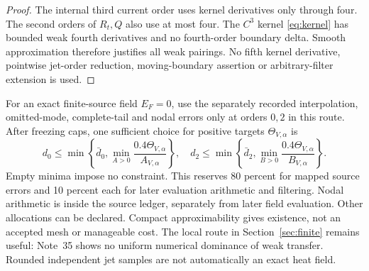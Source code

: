 \begin{proof}
The internal third current order uses kernel derivatives only through
four. The second orders of $R_t,Q$ also use at most four. The $C^3$
kernel \eqref{eq:kernel} has bounded weak fourth derivatives and no
fourth-order boundary delta. Smooth approximation therefore justifies
all weak pairings. No fifth kernel derivative, pointwise jet-order
reduction, moving-boundary assertion or arbitrary-filter extension is used.
\end{proof}

For an exact finite-source field $E_F=0$, use the separately recorded
interpolation, omitted-mode, complete-tail and nodal errors only at
orders $0,2$ in this route. After freezing caps, one sufficient choice
for positive targets $\Theta_{V,\alpha}$ is
\begin{equation}
 d_0\le\min\left\{\bar d_0,\min_{A>0}\frac{0.4\Theta_{V,\alpha}}{A_{V,\alpha}}\right\},
 \quad
 d_2\le\min\left\{\bar d_2,\min_{B>0}\frac{0.4\Theta_{V,\alpha}}{B_{V,\alpha}}\right\}.
 \label{eq:cj-budget}
\end{equation}
Empty minima impose no constraint. This reserves 80 percent for mapped
source errors and 10 percent each for later evaluation arithmetic and
filtering. Nodal arithmetic is inside the source ledger, separately
from later field evaluation. Other allocations can be declared. Compact
approximability gives existence, not an accepted mesh or manageable cost.
The local route in Section~\ref{sec:finite} remains useful: Note~35
\cite{n35} shows no uniform numerical dominance of weak transfer.
Rounded independent jet samples are not automatically an exact heat field.


